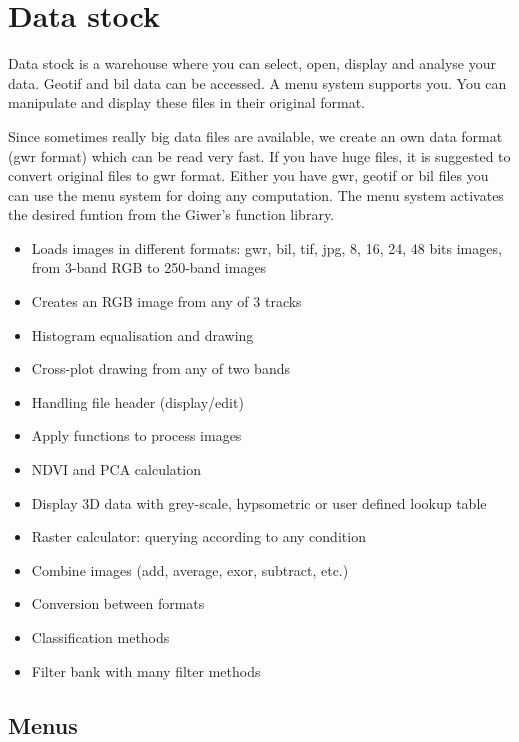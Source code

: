 \documentclass[a4paper,12pt]{article}
\begin{document}
\section{Data stock}

Data stock is a warehouse where you can select, open, display and analyse your data.  Geotif and bil data can be accessed.  A menu system supports you.   You  can  manipulate  and  display  these  files  in  their  original  format.

Since sometimes really big data files are available, we create an own data format (gwr format) which can be read very fast.  If you have huge files, it is suggested to convert original files to gwr format. Either you have gwr, geotif or bil  files you can use the menu system for doing any computation. The menu system activates the desired funtion from the Giwer’s function library.

\begin{itemize}	
\item Loads images in different formats: gwr, bil, tif, jpg, 8, 16, 24, 48 bits images, from 3-band RGB to 250-band images 
\item Creates an RGB image from any of 3 tracks 
\item Histogram equalisation and drawing 
\item Cross-plot drawing from any of two bands
\item Handling file header (display/edit)
\item Apply functions to process images 
\item NDVI and PCA calculation 
\item Display 3D data with grey-scale, hypsometric or user defined lookup table
\item Raster calculator: querying according to any condition  
\item Combine images (add, average, exor, subtract, etc.)
\item Conversion between formats 
\item Classification methods 
\item Filter bank with many filter methods
\end{itemize}



\subsection{Menus}
\end{document}
